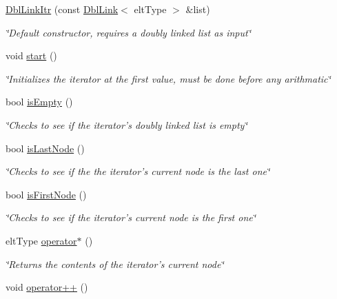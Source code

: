\begin{DoxyCompactItemize}
\item 
\hyperlink{classDblLinkItr_a029e88245826cd3f4940e8c2ccdf1508}{Dbl\-Link\-Itr} (const \hyperlink{classDblLink}{Dbl\-Link}$<$ elt\-Type $>$ \&list)
\begin{DoxyCompactList}\small\item\em \char`\"{}\-Default constructor, requires a doubly linked list as input\char`\"{} \end{DoxyCompactList}\item 
\hypertarget{classDblLinkItr_a1f2303149b9a0ecc0cc94fc3669d42e6}{void \hyperlink{classDblLinkItr_a1f2303149b9a0ecc0cc94fc3669d42e6}{start} ()}\label{classDblLinkItr_a1f2303149b9a0ecc0cc94fc3669d42e6}

\begin{DoxyCompactList}\small\item\em \char`\"{}\-Initializes the iterator at the first value, must be done before any arithmatic\char`\"{} \end{DoxyCompactList}\item 
bool \hyperlink{classDblLinkItr_abd8531686d0efb34dfe334070755bedd}{is\-Empty} ()
\begin{DoxyCompactList}\small\item\em \char`\"{}\-Checks to see if the iterator's doubly linked list is empty\char`\"{} \end{DoxyCompactList}\item 
bool \hyperlink{classDblLinkItr_a481fe000f5c0b9e9a90c8ec947ac2366}{is\-Last\-Node} ()
\begin{DoxyCompactList}\small\item\em \char`\"{}\-Checks to see if the the iterator's current node is the last one\char`\"{} \end{DoxyCompactList}\item 
bool \hyperlink{classDblLinkItr_abd2248f781624a381dcc407af0081314}{is\-First\-Node} ()
\begin{DoxyCompactList}\small\item\em \char`\"{}\-Checks to see if the iterator's current node is the first one\char`\"{} \end{DoxyCompactList}\item 
elt\-Type \hyperlink{classDblLinkItr_ac3e8e420c63d144a562da5dbb8da9ce0}{operator$\ast$} ()
\begin{DoxyCompactList}\small\item\em \char`\"{}\-Returns the contents of the iterator's current node\char`\"{} \end{DoxyCompactList}\item 
\hypertarget{classDblLinkItr_a6880f6792f580bcbaa677c509bcfef8a}{void \hyperlink{classDblLinkItr_a6880f6792f580bcbaa677c509bcfef8a}{operator++} ()}\label{classDblLinkItr_a6880f6792f580bcbaa677c509bcfef8a}


\end{DoxyCompactItemize}
